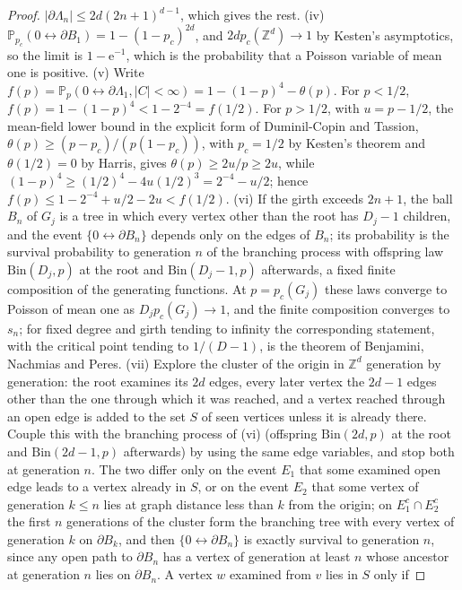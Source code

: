 \documentclass[11pt]{article}
\theoremstyle{definition}
\newcommand{\e}{\mathrm{e}}
\newcommand{\Pp}{\mathbb P}
\newcommand{\Z}{\mathbb Z}
\providecommand{\Z}{\mathbb Z}
\providecommand{\Pp}{\mathbb P}
\begin{document}
\begin{proof}
$|\partial\Lambda_n|\le2d(2n+1)^{d-1}$, which gives the rest.
{\rm(iv)} $\Pp_{p_c}(0\leftrightarrow\partial B_1)=1-(1-p_c)^{2d}$, and
$2dp_c(\Z^d)\to1$ by Kesten's asymptotics, so the limit is
$1-\e^{-1}$, which is the probability that a Poisson variable of mean one
is positive.
{\rm(v)} Write $f(p)=\Pp_p(0\leftrightarrow\partial\Lambda_1,|C|<\infty)=1-(1-p)^4-\theta(p)$.
For $p<1/2$, $f(p)=1-(1-p)^4<1-2^{-4}=f(1/2)$.  For $p>1/2$, with
$u=p-1/2$, the mean-field lower bound in the explicit form of
Duminil-Copin and Tassion,
$\theta(p)\ge(p-p_c)/(p(1-p_c))$, with $p_c=1/2$ by Kesten's
theorem and $\theta(1/2)=0$ by Harris,
gives $\theta(p)\ge2u/p\ge2u$, while
$(1-p)^4\ge(1/2)^4-4u(1/2)^3=2^{-4}-u/2$; hence
$f(p)\le1-2^{-4}+u/2-2u<f(1/2)$.
{\rm(vi)} If the girth exceeds $2n+1$, the ball $B_n$ of $G_j$ is a tree in
which every vertex other than the root has $D_j-1$ children, and the event
$\{0\leftrightarrow\partial B_n\}$ depends only on the edges of $B_n$; its
probability is the survival probability to generation $n$ of the
branching process with offspring law $\mathrm{Bin}(D_j,p)$ at the root and
$\mathrm{Bin}(D_j-1,p)$ afterwards, a fixed finite composition of the
generating functions.  At $p=p_c(G_j)$ these laws converge to Poisson of
mean one as $D_jp_c(G_j)\to1$, and the finite composition converges to
$s_n$; for fixed degree and girth tending to infinity the corresponding
statement, with the critical point tending to $1/(D-1)$, is the theorem
of Benjamini, Nachmias and Peres.
{\rm(vii)} Explore the cluster of the origin in $\Z^d$ generation by
generation: the root examines its $2d$ edges, every later vertex the
$2d-1$ edges other than the one through which it was reached, and a
vertex reached through an open edge is added to the set $S$ of seen
vertices unless it is already there.  Couple this with the branching
process of {\rm(vi)} (offspring $\mathrm{Bin}(2d,p)$ at the root and
$\mathrm{Bin}(2d-1,p)$ afterwards) by using the same edge variables, and
stop both at generation $n$.  The two differ only on the event $E_1$ that
some examined open edge leads to a vertex already in $S$, or on the
event $E_2$ that some vertex of generation $k\le n$ lies at graph
distance less than $k$ from the origin; on $E_1^c\cap E_2^c$ the first $n$
generations of the cluster form the branching tree with every vertex of
generation $k$ on $\partial B_k$, and then $\{0\leftrightarrow\partial B_n\}$
is exactly survival to generation $n$, since any open path to $\partial B_n$
has a vertex of generation at least $n$ whose ancestor at generation $n$
lies on $\partial B_n$.  A vertex $w$ examined from $v$ lies in $S$ only if

\end{proof}
\end{document}
